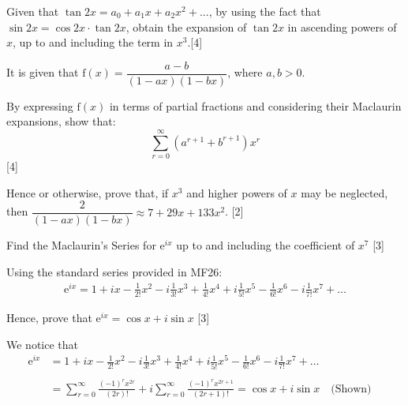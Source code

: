 \documentclass[12pt, a4 paper]{article}
\begin{document}
\begin{outline}[enumerate]
 \1 Given that $\tan{2x}=a_{0}+a_{1}x+a_{2}x^2+...$, by using the fact that $\sin{2x}=\cos{2x}\cdot \tan{2x}$, obtain the expansion of $\tan{2x}$ in ascending powers of $x$, up to and including the term in $x^3$.\hfill[4] %

 \1 It is given that $\textrm{f}(x)=\dfrac{a-b}{(1-ax)(1-bx)}$, where $a,b>0$. %

 \2 By expressing $\textrm{f}(x)$ in terms of partial fractions and considering their Maclaurin expansions, show that:
 \begin{equation*}
   \sum_{r=0}^{\infty}(a^{r+1}+b^{r+1})x^{r}
 \end{equation*}\hfill[4]

 \2 Hence or otherwise, prove that, if $x^3$ and higher powers of $x$ may be neglected, then $\dfrac{2}{(1-ax)(1-bx)} \approx 7+29x+133x^2$.
 \hfill[2]

 \1 Find the Maclaurin's Series for $\mathrm{e}^{ix}$ up to and including the coefficient of $x^7$ \hfill[3]
 \begin{answer}
   Using the standard series provided in MF26:
   \begin{align*}
     \mathrm{e}^{ix} = 1 + ix - \frac{1}{2!}x^2 - i\frac{1}{3!}x^3 + \frac{1}{4!}x^4 + i\frac{1}{5!}x^5 - \frac{1}{6!}x^6 - i\frac{1}{7!}x^7+ \dots
   \end{align*}
 \end{answer}
 Hence, prove that $\mathrm{e}^{ix} = \cos x + i\sin x$ \hfill[3] %
 \begin{answer}
   We notice that
   \begin{align*}
     \mathrm{e}^{ix} &= 1 + ix - \frac{1}{2!}x^2 - i\frac{1}{3!}x^3 + \frac{1}{4!}x^4 + i\frac{1}{5!}x^5 - \frac{1}{6!}x^6 - i\frac{1}{7!}x^7+ \dots \\\\
     &= \sum_{r=0}^{\infty} \frac{(-1)^r x^{2r}}{(2r)!} + i\sum_{r=0}^{\infty} \frac{(-1)^r x^{2r+1}}{(2r+1)!} = \cos x + i\sin x \quad\textrm{(Shown)}\quad 
   \end{align*}
 \end{answer}
\end{outline}
\end{document}
